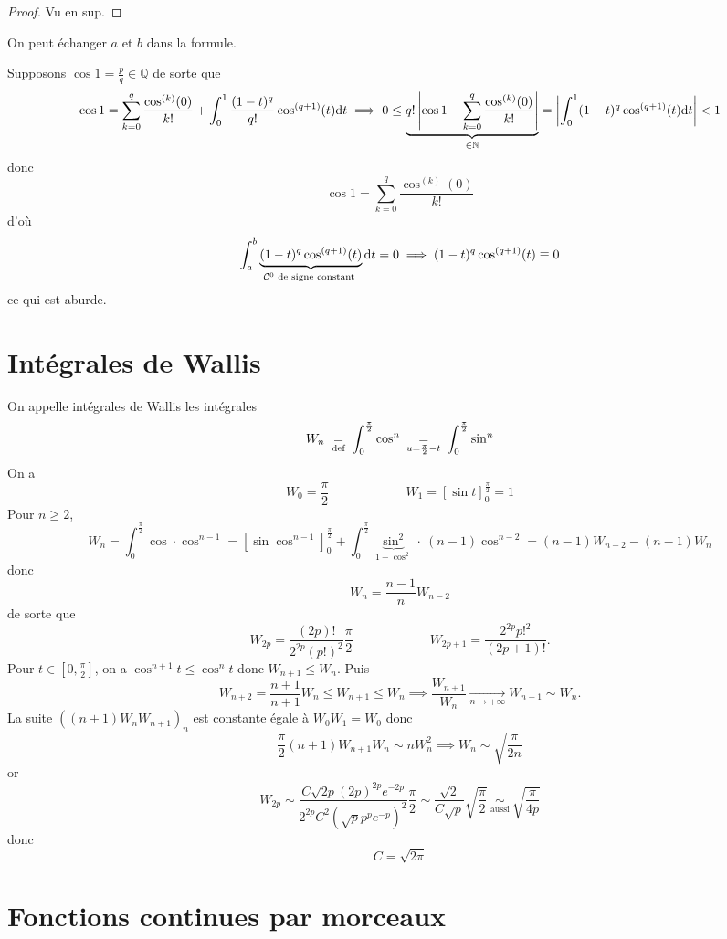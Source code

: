 \begin{proof}
    Vu en sup.
\end{proof}

\begin{rem}
    On peut échanger $a$ et $b$ dans la formule.
\end{rem}

\begin{ex}
    Supposons $\cos 1=\frac pq\in\mathbb Q$ de sorte que \[
        \cos 1=\sum_{k=0}^q\frac{\cos^{(k)}(0)}{k!}+\int_0^1\frac{(1-t)^q}{q!}\cos^{(q+1)}(t)\mathrm{d} t\implies0\leq \underbrace{q! \left| \cos 1-\sum_{k=0}^q\frac{\cos^{(k)}(0)}{k!} \right|}_{\in\mathbb N}= \left| \int_0^1(1-t)^q\cos^{(q+1)}(t)\mathrm{d} t \right|<1
    \]
    donc \[
        \cos 1=\sum_{k=0}^q\frac{\cos^{(k)}(0)}{k!}
    \]
    d'où \[
        \int_a^b\underbrace{(1-t)^q\cos^{(q+1)}(t)}_{\mathcal C^0\text{ de signe constant }}\mathrm{d} t=0\implies (1-t)^q\cos^{(q+1)}(t)\equiv 0
    \]
    ce qui est aburde.
\end{ex}

\section{Intégrales de Wallis}
\label{sec:wallis}

On appelle intégrales de Wallis les intégrales \[
    W_n\;\underset{\text{def}}=\;\int_0^{\frac\pi2}\cos^n\underset{\;u=\frac\pi2-t\;}=\int_0^{\frac\pi2}\sin^n
\]
On a \[
    W_0=\frac\pi2\qquad \qquad \qquad W_1=[\sin t]_0^{\frac\pi2}=1
\]
Pour $n\geq 2$, \[
    W_n=\int_0^{\frac\pi2}\cos \cdot \cos^{n-1}=[\sin\cos^{n-1}]_0^{\frac\pi2}+\int_0^{\frac\pi2}\underbrace{\sin^2}_{1-\cos^2}\cdot~(n-1)\cos^{n-2}=(n-1)W_{n-2}-(n-1)W_n
\]
donc \[
W_n=\frac{n-1}nW_{n-2}
\]
de sorte que \[
    W_{2p}=\frac{(2p)!}{2^{2p}(p!)^2}\frac\pi2\qquad\qquad\qquad W_{2p+1}=\frac{2^{2p}p!^2}{(2p+1)!}.
\]
Pour $t\in [0, \frac\pi2]$, on a $\cos^{n+1}t\leq \cos^nt$ donc $W_{n+1}\leq W_n$. Puis \[
    W_{n+2}=\frac{n+1}{n+1}W_n\leq W_{n+1}\leq W_n \implies \frac{W_{n+1}}{W_n}\xrightarrow[n\to+\infty]{}W_{n+1}\sim W_n.
\]
La suite $((n+1)W_nW_{n+1})_n$ est constante égale à $W_0W_1=W_0$ donc \[
    \frac\pi2(n+1)W_{n+1}W_n\sim nW_n^2\implies W_n\sim\sqrt{\frac{\pi}{2n}}
\]
or \[
    W_{2p}\sim\frac{C\sqrt{2p}(2p)^{2p}e^{-2p}}{2^{2p}C^2(\sqrt pp^pe^{-p})^2}\frac\pi2\sim \frac{\sqrt2}{C\sqrt p}\sqrt{\frac\pi2}\underset{\text{ aussi }}\sim\sqrt{\frac{\pi}{4p}}
\]
donc \[
    C=\sqrt {2\pi}
\]

\section{Fonctions continues par morceaux}

